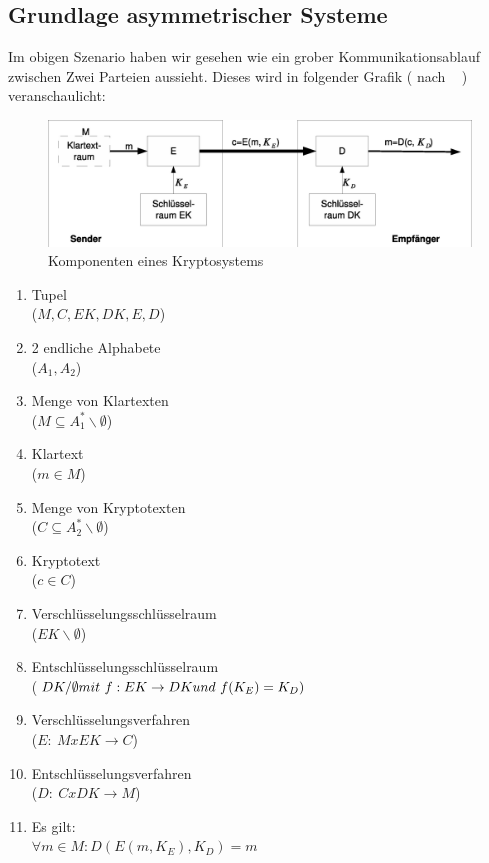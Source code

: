 \documentclass[paper=a4,11pt,german]{scrartcl} %
\begin{document}
\subsection{Grundlage asymmetrischer Systeme}
Im obigen Szenario haben wir gesehen wie ein grober Kommunikationsablauf zwischen Zwei Parteien aussieht. Dieses wird in folgender Grafik ( nach ~\cite{Eckert13} ) veranschaulicht:
\begin{figure}[htb]
	\centering
	\includegraphics[width=\textwidth]{async.eps}
	\caption{Komponenten eines Kryptosystems}
	\label{fig:sim}
\end{figure}
\begin{multicols}{2}
\begin{enumerate}
\item Tupel \\($M,C,EK,DK,E,D$)
\item 2 endliche Alphabete \\($A_1,A_2$)
\item Menge von Klartexten \\($M \subseteq A^*_1\backslash\emptyset$)
\item Klartext \\($m \in M$)
\item Menge von Kryptotexten \\($C \subseteq A^*_2\backslash\emptyset$)
\item Kryptotext \\($c \in C$)
\item Verschlüsselungsschlüsselraum \\($EK\backslash\emptyset$)
\item Entschlüsselungsschlüsselraum\\($DK/\emptyset \\mit~ f:EK \rightarrow DK \\und~ f(K_E)=K_D)$
\item Verschlüsselungsverfahren \\($E :~ M x EK \rightarrow C$)
\item Entschlüsselungsverfahren \\($D :~ C x DK \rightarrow M$)
\item Es gilt: \\ $\forall m \in M : D(E(m,K_E),K_D) = m$
\end{enumerate}
\end{multicols}
\end{document}
